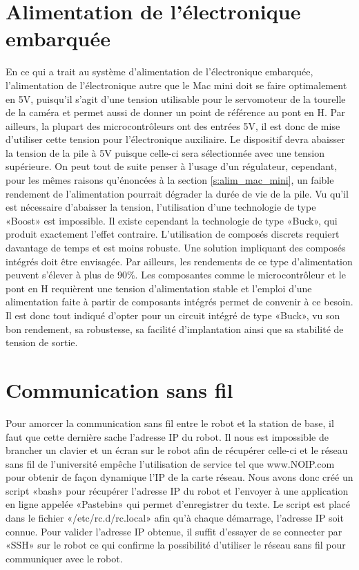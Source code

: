 \section{Alimentation de l'électronique embarquée}
En ce qui a trait au système d'alimentation de l'électronique embarquée, l'alimentation de l'électronique autre que le Mac mini doit se faire optimalement en 5V, puisqu'il s'agit d'une tension utilisable pour le servomoteur de la tourelle de la caméra et permet aussi de donner un point de référence au pont en H. Par ailleurs, la plupart des microcontrôleurs ont des entrées 5V, il est donc de mise d'utiliser cette tension pour l'électronique auxiliaire. Le dispositif devra abaisser la tension de la pile à 5V puisque celle-ci sera sélectionnée avec une tension supérieure. On peut tout de suite penser à l'usage d'un régulateur, cependant, pour les mêmes raisons qu'énoncées à la section \ref{s:alim_mac_mini}, un faible rendement de l'alimentation pourrait dégrader la durée de vie de la pile. Vu qu'il est nécessaire d'abaisser la tension, l'utilisation d'une technologie de type «Boost» est impossible. Il existe cependant la technologie de type «Buck», qui produit exactement l'effet contraire. L'utilisation de composés discrets requiert davantage de temps et est moins robuste. Une solution impliquant des composés intégrés doit être envisagée. Par ailleurs, les rendements de ce type d'alimentation peuvent s'élever à plus de 90\%. Les composantes comme le microcontrôleur et le pont en H requièrent une tension d'alimentation stable et l'emploi d'une alimentation faite à partir de composants intégrés permet de convenir à ce besoin. Il est donc tout indiqué d'opter pour un circuit intégré de type «Buck», vu son bon rendement, sa robustesse, sa facilité d'implantation ainsi que sa stabilité de tension de sortie.

\section{Communication sans fil}\label{s:sansfil}
Pour amorcer la communication sans fil entre le robot et la station de base, il faut que cette dernière sache l'adresse IP du robot. Il nous est impossible de brancher un clavier et un écran sur le robot afin de récupérer celle-ci et le réseau sans fil de l'université empêche l'utilisation de service tel que www.NOIP.com pour obtenir de façon dynamique l'IP de la carte réseau. Nous avons donc créé un script «bash» pour récupérer l'adresse IP du robot et l'envoyer à une application en ligne appelée «Pastebin» qui permet d'enregistrer du texte. Le script est placé dans le fichier «/etc/rc.d/rc.local» afin qu'à chaque démarrage, l'adresse IP soit connue. Pour valider l'adresse IP obtenue, il suffit d'essayer de se connecter par «SSH» sur le robot ce qui confirme la possibilité d'utiliser le réseau sans fil pour communiquer avec le robot.

